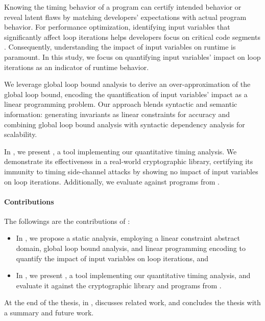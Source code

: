 Knowing the timing behavior of a program can certify intended behavior or reveal latent flaws by matching developers' expectations with actual program behavior.
For performance optimization, identifying input variables that significantly affect loop iterations helps developers focus on critical code segments .
Consequently, understanding the impact of input variables on runtime is paramount.
In this study, we focus on quantifying input variables' impact on loop iterations as an indicator of runtime behavior.

We leverage global loop bound analysis to derive an over-approximation of the global loop bound, encoding the quantification of input variables' impact as a linear programming problem.
Our approach blends syntactic and semantic information: generating invariants as linear constraints for accuracy and combining global loop bound analysis with syntactic dependency analysis  for scalability.

In , we present \timesec\sidenote{\timesecurl}, a tool implementing our quantitative timing analysis.
We demonstrate its effectiveness in a real-world cryptographic library, certifying its immunity to timing side-channel attacks by showing no impact of input variables on loop iterations.
Additionally, we evaluate \timesec{} against programs from \svcomp.


\paragraph{Contributions}

The followings are the contributions of :

\begin{itemize}
  \item In , we propose a static analysis, employing a linear constraint abstract domain, global loop bound analysis, and linear programming encoding to quantify the impact of input variables on loop iterations, and
  \item In , we present \timesec\sidenote{\timesecurl}, a tool implementing our quantitative timing analysis, and evaluate it against the \bignum{} cryptographic library\sidenote{\bignumurl} and programs from \svcomp \sidenote{\svcompurl}.
\end{itemize}

At the end of the thesis, in ,  discusses related work, and  concludes the thesis with a summary and future work.
